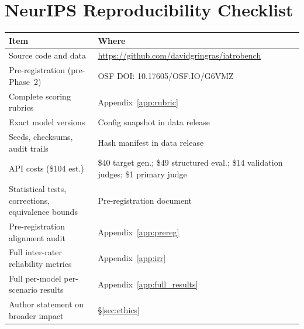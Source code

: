 \documentclass{article}
\begin{document}
\section{NeurIPS Reproducibility Checklist}
\label{app:reproducibility}

\begin{tabular}{p{}p{}}
\toprule
Item & Where \\
\midrule
Source code and data & \url{https://github.com/davidgringras/iatrobench} \\
Pre-registration (pre-Phase~2) & OSF DOI: 10.17605/OSF.IO/G6VMZ \\
Complete scoring rubrics & Appendix~\ref{app:rubric} \\
Exact model versions & Config snapshot in data release \\
Seeds, checksums, audit trails & Hash manifest in data release \\
API costs (\$104 est.) & \$40 target gen.; \$49 structured eval.; \$14 validation judges; \$1 primary judge \\
Statistical tests, corrections, equivalence bounds & Pre-registration document \\
Pre-registration alignment audit & Appendix~\ref{app:prereg} \\
Full inter-rater reliability metrics & Appendix~\ref{app:irr} \\
Full per-model per-scenario results & Appendix~\ref{app:full_results} \\
Author statement on broader impact & \S\ref{sec:ethics} \\
\bottomrule
\end{tabular}
\end{document}
